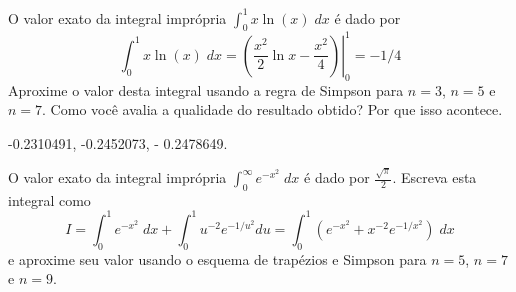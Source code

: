 

\begin{exer}
O valor exato da integral imprópria $\int_0^1x\ln(x)\;dx$ é dado por
$$\int_0^1x\ln(x)\;dx=\left.\left(\frac{x^2}{2}\ln x-\frac{x^2}{4}\right)\right|_0^1=-1/4$$
Aproxime o valor desta integral usando a regra  de Simpson para $n=3$, $n=5$ e $n=7$. Como você avalia a qualidade do resultado obtido? Por que isso acontece.
\end{exer}
\begin{resp}
  
-0.2310491, -0.2452073, - 0.2478649.    
  
\end{resp}

\begin{exer}
O valor exato da integral imprópria $\int_0^\infty e^{-x^2}\;dx$ é dado por $\frac{\sqrt{\pi}}{2}$.
Escreva esta integral como
$$I=\int_0^1 e^{-x^2}\;dx+\int_0^1 u^{-2} e^{-1/u^2}du=\int_0^1 \left(e^{-x^2}+x^{-2}e^{-1/x^2}\right)\;dx$$
e aproxime seu valor usando o esquema de trapézios e Simpson para $n=5$, $n=7$ e $n=9$.
\end{exer}

